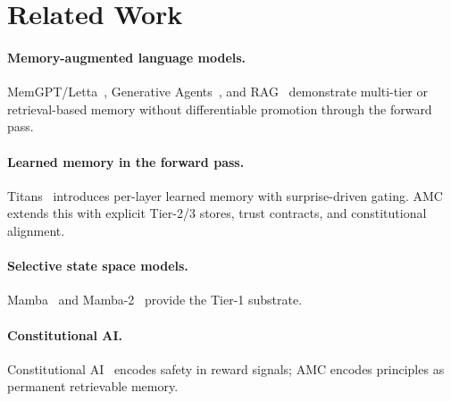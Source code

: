 \section{Related Work}
\label{sec:related}

\paragraph{Memory-augmented language models.}
MemGPT/Letta~\citep{packer2023memgpt}, Generative
Agents~\citep{park2023generative}, and
RAG~\citep{lewis2020rag} demonstrate multi-tier or retrieval-based
memory without differentiable promotion through the forward pass.

\paragraph{Learned memory in the forward pass.}
Titans~\citep{bulian2025titans} introduces per-layer learned memory
with surprise-driven gating. AMC extends this with explicit Tier-2/3
stores, trust contracts, and constitutional alignment.

\paragraph{Selective state space models.}
Mamba~\citep{gu2023mamba} and Mamba-2~\citep{dao2024transformers}
provide the Tier-1 substrate.

\paragraph{Constitutional AI.}
Constitutional AI~\citep{bai2022constitutional} encodes safety in reward
signals; AMC encodes principles as permanent retrievable memory.

